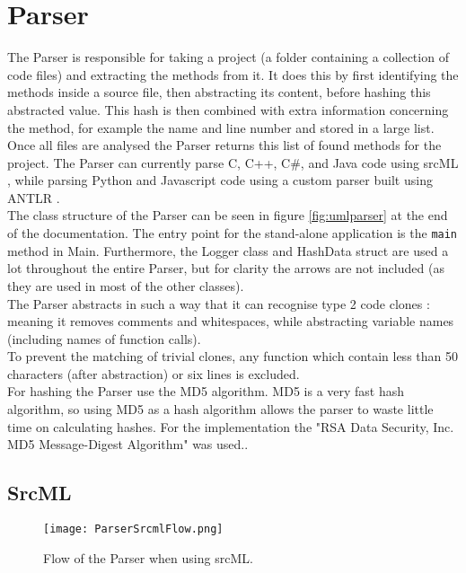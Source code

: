 \documentclass[../Main.tex]{subfiles}
\begin{document}
\newpage
\section{Parser}
The Parser is responsible for taking a project (a folder containing a collection of code files) and extracting the methods from it. It does this by first identifying the methods inside a source file, then abstracting its content, before hashing this abstracted value. This hash is then combined with extra information concerning the method, for example the name and line number and stored in a large list. Once all files are analysed the Parser returns this list of found methods for the project. The Parser can currently parse C, C++, C\#, and Java code using srcML \cite{srcML}, while parsing Python and Javascript code using a custom parser built using ANTLR \cite{ANTLR}.\\

The class structure of the Parser can be seen in figure \cref{fig:umlparser} at the end of the documentation. The entry point for the stand-alone application is the \texttt{main} method in Main. Furthermore, the Logger class and HashData struct are used a lot throughout the entire Parser, but for clarity the arrows are not included (as they are used in most of the other classes).\\

The Parser abstracts in such a way that it can recognise type 2 code clones \cite{VUDDY, code_clones_1, code_clones_2}: meaning it removes comments and whitespaces, while abstracting variable names (including names of function calls).\\

To prevent the matching of trivial clones, any function which contain less than 50 characters (after abstraction) or six lines is excluded.\\

For hashing the Parser use the MD5 algorithm. MD5 is a very fast hash algorithm, so using MD5 as a hash algorithm allows the parser to waste little time on calculating hashes. For the implementation the "RSA Data Security, Inc. MD5 Message-Digest Algorithm" was used..


\subsection{SrcML}

\begin{figure}[h]
    \centering
    \texttt{[image: ParserSrcmlFlow.png]} 
    \caption{Flow of the Parser when using srcML.}
    \label{fig:srcmlParserFlow}
\end{figure}
\end{document}
